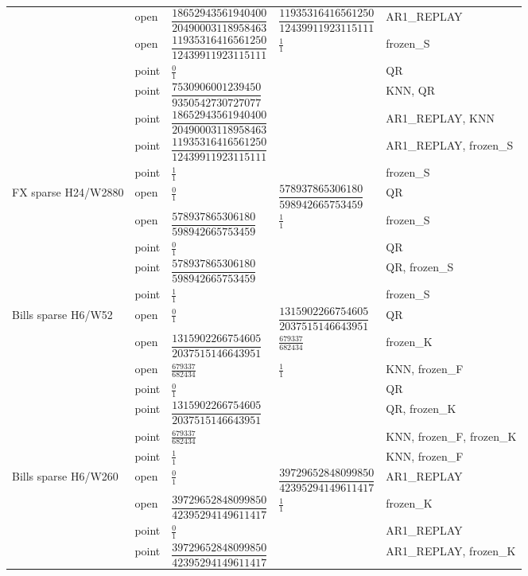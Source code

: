\documentclass[11pt,a4paper]{article}
\begin{document}
\begin{longtable}{p{28mm}p{10mm}p{39mm}p{39mm}p{28mm}}
 & open & \(\dfrac{18652943561940400}{20490003118958463}\) & \(\dfrac{11935316416561250}{12439911923115111}\) & AR1\_REPLAY \\
 & open & \(\dfrac{11935316416561250}{12439911923115111}\) & \(\frac{1}{1}\) & frozen\_S \\
 & point & \(\frac{0}{1}\) &  & QR \\
 & point & \(\dfrac{7530906001239450}{9350542730727077}\) &  & KNN, QR \\
 & point & \(\dfrac{18652943561940400}{20490003118958463}\) &  & AR1\_REPLAY, KNN \\
 & point & \(\dfrac{11935316416561250}{12439911923115111}\) &  & AR1\_REPLAY, frozen\_S \\
 & point & \(\frac{1}{1}\) &  & frozen\_S \\
FX sparse H24/W2880 & open & \(\frac{0}{1}\) & \(\dfrac{578937865306180}{598942665753459}\) & QR \\
 & open & \(\dfrac{578937865306180}{598942665753459}\) & \(\frac{1}{1}\) & frozen\_S \\
 & point & \(\frac{0}{1}\) &  & QR \\
 & point & \(\dfrac{578937865306180}{598942665753459}\) &  & QR, frozen\_S \\
 & point & \(\frac{1}{1}\) &  & frozen\_S \\
Bills sparse H6/W52 & open & \(\frac{0}{1}\) & \(\dfrac{1315902266754605}{2037515146643951}\) & QR \\
 & open & \(\dfrac{1315902266754605}{2037515146643951}\) & \(\frac{679337}{682434}\) & frozen\_K \\
 & open & \(\frac{679337}{682434}\) & \(\frac{1}{1}\) & KNN, frozen\_F \\
 & point & \(\frac{0}{1}\) &  & QR \\
 & point & \(\dfrac{1315902266754605}{2037515146643951}\) &  & QR, frozen\_K \\
 & point & \(\frac{679337}{682434}\) &  & KNN, frozen\_F, frozen\_K \\
 & point & \(\frac{1}{1}\) &  & KNN, frozen\_F \\
Bills sparse H6/W260 & open & \(\frac{0}{1}\) & \(\dfrac{39729652848099850}{42395294149611417}\) & AR1\_REPLAY \\
 & open & \(\dfrac{39729652848099850}{42395294149611417}\) & \(\frac{1}{1}\) & frozen\_K \\
 & point & \(\frac{0}{1}\) &  & AR1\_REPLAY \\
 & point & \(\dfrac{39729652848099850}{42395294149611417}\) &  & AR1\_REPLAY, frozen\_K \\

\end{longtable}
\end{document}
